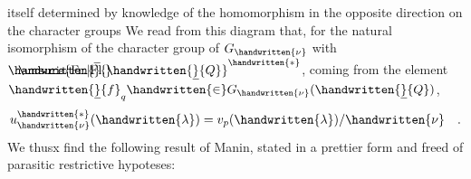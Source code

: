 itself determined by knowledge of the homomorphism in the opposite direction on the character groups
We read from this diagram that, for the natural isomorphism of the character group of $G_{\handwritten{\nu}}$ with $\rlap{$\phantom{Q}\unsure{\mathrm{Fr.}|\mathrm{Fl.}}$}\handwritten{\overline}{\handwritten{\underline}{Q}}^{\handwritten{*}}$, coming from the element $\handwritten{\underline}{f}_q\handwritten{\in}G_{\handwritten{\nu}}(\handwritten{\underline}{Q})$,  
\[
u_{\handwritten{\nu}}^{\handwritten{*}}(\handwritten{\lambda})=v_p(\handwritten{\lambda})/\handwritten{\nu}\quad .
\]
We thusx find the following resul\rlap{(}t of Manin, stated in a prettier form and freed of parasitic restrictive hypoteses:

